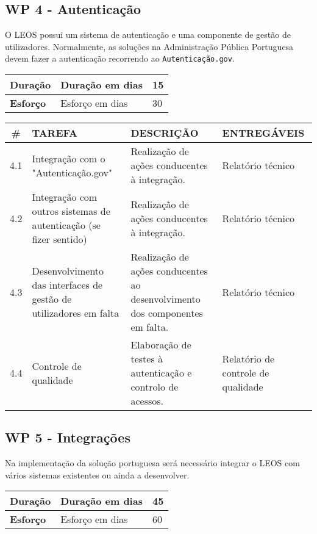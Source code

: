 \subsection{WP 4 - Autenticação}

O LEOS possui um sistema de autenticação e uma componente de gestão de utilizadores.
Normalmente, as soluções na Administração Pública Portuguesa devem fazer a autenticação recorrendo ao \texttt{Autenticação.gov}.

\begin{tabular}{|p{3cm}|p{5cm}|l|}
    \hline
    \textbf{Duração} & Duração em dias & 15 \\
    \hline
    \textbf{Esforço} & Esforço em dias & 30\\
    \hline
\end{tabular}

\vspace{0.5cm}

\begin{longtable}{|c|p{5cm}|p{7cm}|p{3cm}|}
    \hline
    \# & \textbf{TAREFA} & \textbf{DESCRIÇÃO} & \textbf{ENTREGÁVEIS} \\
    \hline
    4.1 & Integração com o "Autenticação.gov" & Realização de ações conducentes à integração. & Relatório técnico \\
    \hline
    4.2 & Integração com outros sistemas de autenticação (se fizer sentido) & Realização de ações conducentes à integração. & Relatório técnico \\
    \hline
    4.3 & Desenvolvimento das interfaces de gestão de utilizadores em falta & 
    Realização de ações conducentes ao desenvolvimento dos componentes em falta. & Relatório técnico \\
    \hline
    4.4 & Controle de qualidade & Elaboração de testes à autenticação e controlo de acessos. 
    & Relatório de controle de qualidade \\
    \hline
\end{longtable}


\subsection{WP 5 - Integrações}

Na implementação da solução portuguesa será necessário integrar o LEOS com vários sistemas existentes ou ainda a desenvolver.

\begin{tabular}{|p{3cm}|p{5cm}|l|}
    \hline
    \textbf{Duração} & Duração em dias & 45 \\
    \hline
    \textbf{Esforço} & Esforço em dias & 60\\
    \hline
\end{tabular}

